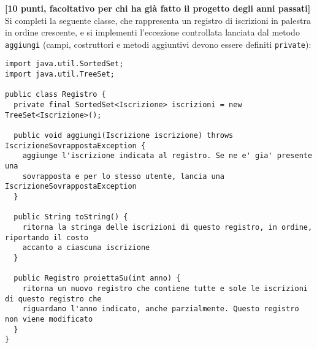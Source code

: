 \documentclass{article}[10pt]
\newcounter{esnu}
\newenvironment{esercizio}{\medskip \noindent {\bf Esercizio\addtocounter{esnu}{1} \arabic{esnu}}}{}
\begin{document}
\begin{esercizio}
  \textbf{[10 punti, facoltativo per chi ha gi\`a fatto il progetto degli anni passati]}
  Si completi la seguente classe, che rappresenta un registro di iscrizioni in palestra
  in ordine crescente,
  e si implementi l'eccezione controllata lanciata dal metodo \texttt{aggiungi}
  (campi, costruttori e metodi aggiuntivi devono essere definiti \texttt{private}):

  {\small\begin{verbatim}
import java.util.SortedSet;
import java.util.TreeSet;

public class Registro {
  private final SortedSet<Iscrizione> iscrizioni = new TreeSet<Iscrizione>();
  
  public void aggiungi(Iscrizione iscrizione) throws IscrizioneSovrappostaException {
    aggiunge l'iscrizione indicata al registro. Se ne e' gia' presente una
    sovrapposta e per lo stesso utente, lancia una IscrizioneSovrappostaException
  }

  public String toString() {
    ritorna la stringa delle iscrizioni di questo registro, in ordine, riportando il costo
    accanto a ciascuna iscrizione
  }

  public Registro proiettaSu(int anno) {
    ritorna un nuovo registro che contiene tutte e sole le iscrizioni di questo registro che
    riguardano l'anno indicato, anche parzialmente. Questo registro non viene modificato
  }
}
  \end{verbatim}}

\end{esercizio}
\end{document}
